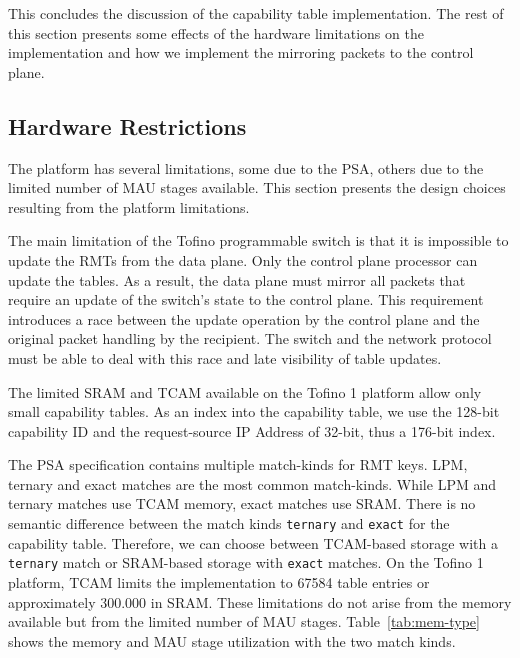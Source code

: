 This concludes the discussion of the capability table implementation. The rest of this section presents some effects of the hardware limitations on the implementation and how we implement the mirroring packets to the control plane.

\subsection{Hardware Restrictions}\label{sec:design-inn}
The \tofino{} platform has several limitations, some due to the \ac{PSA}, others due to the limited number of \ac{MAU} stages available. This section presents the design choices resulting from the platform limitations.

The main limitation of the Tofino programmable switch is that it is impossible to update the \acp{RMT} from the data plane. Only the control plane processor can update the tables. As a result, the data plane must mirror all packets that require an update of the switch's state to the control plane. This requirement introduces a race between the update operation by the control plane and the original packet handling by the recipient. The switch and the network protocol must be able to deal with this race and late visibility of table updates.

The limited \ac{SRAM} and \ac{TCAM} available on the Tofino 1 platform allow only small capability tables. As an index into the capability table, we use the 128-bit capability ID and the request-source IP Address of 32-bit, thus a 176-bit index.

The \ac{PSA} specification contains multiple match-kinds for \ac{RMT} keys. \ac{LPM}, ternary and exact matches are the most common match-kinds. While \ac{LPM} and ternary matches use \ac{TCAM} memory, exact matches use \ac{SRAM}.
There is no semantic difference between the match kinds \texttt{ternary} and \texttt{exact} for the capability table. Therefore, we can choose between \ac{TCAM}-based storage with a \texttt{ternary} match or \ac{SRAM}-based storage with \texttt{exact} matches.
On the Tofino 1 platform, \ac{TCAM} limits the implementation to 67584 table entries or approximately 300.000 in \ac{SRAM}. These limitations do not arise from the memory available but from the limited number of \ac{MAU} stages. Table~\ref{tab:mem-type} shows the memory and \ac{MAU} stage utilization with the two match kinds.

